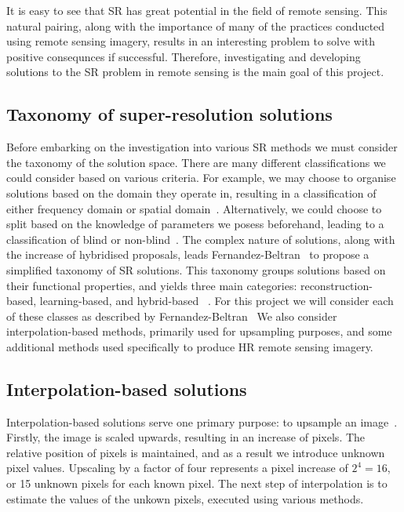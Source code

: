 It is easy to see that SR has great potential in the field of remote sensing. This natural pairing, along with the importance of many of the practices conducted using remote sensing imagery, results in an interesting problem to solve with positive consequnces if successful. Therefore, investigating and developing solutions to the SR problem in remote sensing is the main goal of this project.

\subsection{Taxonomy of super-resolution solutions}
Before embarking on the investigation into various SR methods we must consider the taxonomy of the solution space. There are many different classifications we could consider based on various criteria. For example, we may choose to organise solutions based on the domain they operate in, resulting in a classification of either frequency domain or spatial domain~\cite{superResRemoteSensingOverview}. Alternatively, we could choose to split based on the knowledge of parameters we posess beforehand, leading to a classification of blind or non-blind~\cite{superResRemoteSensingOverview}. The complex nature of solutions, along with the increase of hybridised proposals, leads Fernandez-Beltran \etal\ to propose a simplified taxonomy of SR solutions. This taxonomy groups solutions based on their functional properties, and yields three main categories: reconstruction-based, learning-based, and hybrid-based ~\cite{superResRemoteSensingOverview}. For this project we will consider each of these classes as described by Fernandez-Beltran \etal\ We also consider interpolation-based methods, primarily used for upsampling purposes, and some additional methods used specifically to produce HR remote sensing imagery.

\subsection{Interpolation-based solutions}
Interpolation-based solutions serve one primary purpose: to upsample an image~\cite{interpolation}. Firstly, the image is scaled upwards, resulting in an increase of pixels. The relative position of pixels is maintained, and as a result we introduce unknown pixel values. Upscaling by a factor of four represents a pixel increase of $2^4 = 16$, or 15 unknown pixels for each known pixel. The next step of interpolation is to estimate the values of the unkown pixels, executed using various methods.

